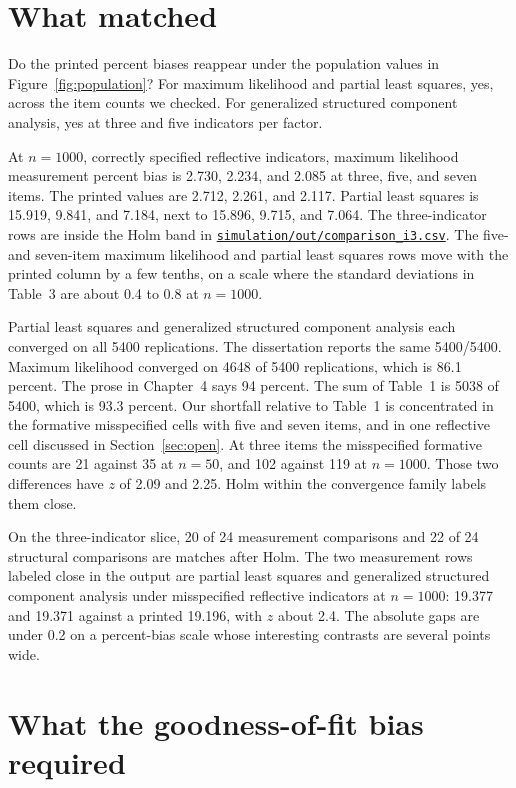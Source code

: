 \documentclass[11pt]{article}
\gdef\linkcsv{\href{https://github.com/alectionary/vibe-math/blob/master/formalization/chumney-sem-small-samples/simulation/out/comparison_i3.csv}{\texttt{simulation/out/comparison_i3.csv}}}
\begin{document}
\section{What matched}
\label{sec:matched}

Do the printed percent biases reappear under the population values in
Figure~\ref{fig:population}? For maximum likelihood and partial least
squares, yes, across the item counts we checked. For generalized structured
component analysis, yes at three and five indicators per factor.

At $n=1000$, correctly specified reflective indicators, maximum likelihood
measurement percent bias is 2.730, 2.234, and 2.085 at three, five, and
seven items. The printed values are 2.712, 2.261, and 2.117. Partial least
squares is 15.919, 9.841, and 7.184, next to 15.896, 9.715, and 7.064.
The three-indicator rows are inside the Holm band in
\linkcsv. The five- and seven-item
maximum likelihood and partial least squares rows move with the printed
column by a few tenths, on a scale where the standard deviations in
Table~3 are about 0.4 to 0.8 at $n=1000$.

Partial least squares and generalized structured component analysis each
converged on all 5400 replications. The dissertation reports the same
5400/5400. Maximum likelihood converged on 4648 of 5400 replications, which
is 86.1 percent. The prose in Chapter~4 says 94 percent. The sum of
Table~1 is 5038 of 5400, which is 93.3 percent. Our shortfall relative to
Table~1 is concentrated in the formative misspecified cells with five and
seven items, and in one reflective cell discussed in
Section~\ref{sec:open}. At three items the misspecified formative counts
are 21 against 35 at $n=50$, and 102 against 119 at $n=1000$. Those two
differences have $z$ of 2.09 and 2.25. Holm within the convergence family
labels them close.

On the three-indicator slice, 20 of 24 measurement comparisons and 22 of 24
structural comparisons are matches after Holm. The two measurement rows
labeled close in the output are partial least squares and generalized
structured component analysis under misspecified reflective indicators at
$n=1000$: 19.377 and 19.371 against a printed 19.196, with $z$ about 2.4.
The absolute gaps are under 0.2 on a percent-bias scale whose interesting
contrasts are several points wide.

\section{What the goodness-of-fit bias required}
\label{sec:gof}
\end{document}
